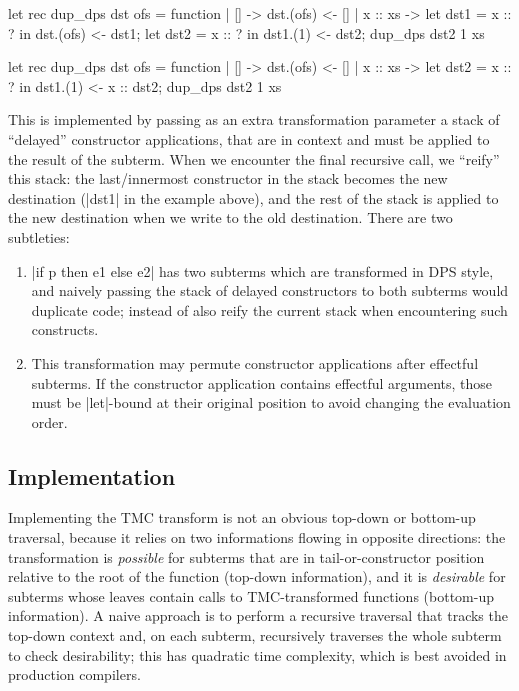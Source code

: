 \begin{minipage}{0.5\linewidth}
\begin{Ocaml}
let rec dup_dps dst ofs = function
| [] -> dst.(ofs) <- []
| x :: xs ->
  let dst1 = x :: ? in
  dst.(ofs) <- dst1;
  let dst2 = x :: ? in
  dst1.(1) <- dst2;
  dup_dps dst2 1 xs
\end{Ocaml}
\end{minipage}
\hfill
\begin{minipage}{0.5\linewidth}
\begin{Ocaml}
let rec dup_dps dst ofs = function
| [] -> dst.(ofs) <- []
| x :: xs ->
  let dst2 = x :: ? in
  dst1.(1) <- x :: dst2;
  dup_dps dst2 1 xs
\end{Ocaml}
\end{minipage}

This is implemented by passing as an extra transformation parameter a stack of ``delayed'' constructor applications, that are in context and must be applied to the result of the subterm. When we encounter the final recursive call, we ``reify'' this stack: the last/innermost constructor in the stack becomes the new destination (\ocaml|dst1| in the example above), and the rest of the stack is applied to the new destination when we write to the old destination. There are two subtleties:
\begin{enumerate}
\item \ocaml|if p then e1 else e2| has two subterms which are transformed in DPS style, and naively passing the stack of delayed constructors to both subterms would duplicate code; instead of also reify the current stack when encountering such constructs.
\item This transformation may permute constructor applications after effectful subterms. If the constructor application contains effectful arguments, those must be \ocaml|let|-bound at their original position to avoid changing the evaluation order.
\end{enumerate}

\subsection{Implementation} \label{subsec:implementation} Implementing the TMC transform is not an obvious top-down or bottom-up traversal, because it relies on two informations flowing in opposite directions: the transformation is \emph{possible} for subterms that are in tail-or-constructor position relative to the root of the function (top-down information), and it is \emph{desirable} for subterms whose leaves contain calls to TMC-transformed functions (bottom-up information). A naive approach is to perform a recursive traversal that tracks the top-down context and, on each subterm, recursively traverses the whole subterm to check desirability; this has quadratic time complexity, which is best avoided in production compilers.

